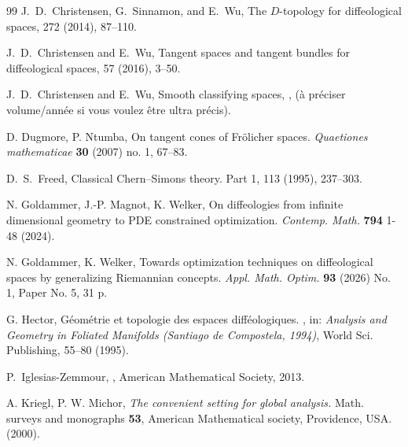 \documentclass[11pt]{amsart}
\begin{document}
\begin{thebibliography}{99}
J.~D.~Christensen, G.~Sinnamon, and E.~Wu,
\newblock The $D$-topology for diffeological spaces,
 272 (2014), 87--110.

J.~D.~Christensen and E.~Wu,
\newblock Tangent spaces and tangent bundles for diffeological spaces,
 57 (2016), 3--50.

J.~D.~Christensen and E.~Wu,
\newblock Smooth classifying spaces,
,
\newblock (à préciser volume/année si vous voulez être ultra précis).

		D. Dugmore, P. Ntumba, On tangent cones of Fr\"olicher spaces.
		\textit{Quaetiones mathematicae} \textbf{30} (2007) no. 1, 67--83.

D.~S.~Freed,
\newblock Classical Chern--Simons theory. Part 1,
 113 (1995), 237--303.

 N. Goldammer, J.-P. Magnot, K. Welker, On diffeologies from infinite dimensional geometry to PDE constrained optimization. \emph{Contemp. Math.} {\bf 794} 1-48 (2024). 

 N. Goldammer, K. Welker,  Towards optimization techniques on diffeological spaces by generalizing Riemannian concepts. \emph{Appl. Math. Optim.} {\bf 93} (2026) No. 1, Paper No. 5, 31 p. 

 G. Hector,
		G\'eom\'etrie et topologie des espaces diff\'eologiques.
		, in: \textit{Analysis and Geometry in Foliated Manifolds
			(Santiago de Compostela, 1994)}, World Sci. Publishing,  55--80 (1995).

P.~Iglesias-Zemmour,
,
\newblock American Mathematical Society, 2013.

		 A. Kriegl, P. W. Michor, \textit{The convenient setting
		for global analysis.} Math. surveys and monographs \textbf{53}, American
	Mathematical society, Providence, USA. (2000).


\end{thebibliography}
\end{document}
